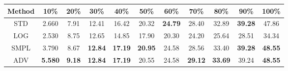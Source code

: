 \documentclass{standalone}
\begin{document}
\begin{tabular}{c|cccccccccc}
      \toprule
      Method & 10\% & 20\% & 30\% & 40\% & 50\% & 60\% & 70\% & 80\% & 90\% & 100\% \\
      \midrule
STD & 2.660 & 7.91 & 12.41 & 16.42 & 20.32 & \textbf{24.79} & 28.40 & 32.89 & \textbf{39.28} & 47.86\\
LOG & 2.530 & 8.75 & 12.65 & 14.85 & 17.90 & 20.30 & 24.20 & 25.64 & 28.51 & 34.34\\
SMPL & 3.790 & 8.67 & \textbf{12.84} & \textbf{17.19} & \textbf{20.95} & 24.58 & 28.56 & 33.40 & \textbf{39.28} & \textbf{48.55}\\
ADV & \textbf{5.580} & \textbf{9.18} & \textbf{12.84} & \textbf{17.19} & 20.55 & 24.58 & \textbf{29.12} & \textbf{33.69} & 39.24 & \textbf{48.55}\\
  \bottomrule
\end{tabular}
\end{document}
